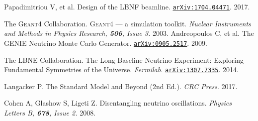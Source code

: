 \begin{thebibliography}{100}
	 Papadimitriou V, et al. Design of the LBNF beamline.
		\href{https://arxiv.org/abs/1704.04471}{\texttt{arXiv:1704.04471}}. 2017.

	 The \textsc{Geant4} Collaboration.
		\textsc{Geant4} --- a simulation toolkit. \textit{Nuclear Instruments and Methods in
		Physics Research, \textbf{506}, Issue 3.} 2003. 
	 Andreopoulos C, et al. The \textsc{GENIE} Neutrino Monte
		Carlo Generator.
		\href{https://arxiv.org/abs/0905.2517}{\texttt{arXiv:0905.2517}}. 2009.

	 The LBNE Collaboration. The Long-Baseline Neutrino Experiment:
		Exploring Fundamental Symmetries of the Universe.
		\textit{Fermilab.}
		\href{https://arxiv.org/abs/1307.7335}{\texttt{arXiv:1307.7335}}. 2014.

	 Langacker P. The Standard Model and Beyond (2nd Ed.).
		\textit{CRC Press}. 2017.

	 Cohen A, Glashow S, Ligeti Z. Disentangling neutrino
		oscillations. \textit{Physics Letters B, \textbf{678}, Issue 2.} 2008.

\end{thebibliography}

